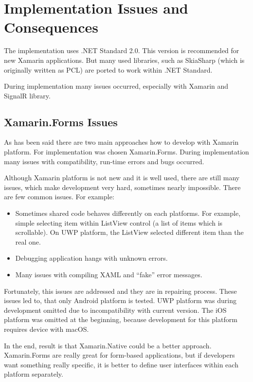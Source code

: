 \section{Implementation Issues and Consequences}
The implementation uses .NET Standard 2.0. This version is recommended for new Xamarin applications. But many used libraries, such as SkiaSharp (which is originally written as PCL) are ported to work within .NET Standard.

During implementation many issues occurred, especially with Xamarin and SignalR library.
\subsection{Xamarin.Forms Issues}
As has been said there are two main approaches how to develop with Xamarin platform. For implementation was chosen Xamarin.Forms. During implementation many issues with compatibility, run-time errors and bugs occurred. 

Although Xamarin platform is not new and it is well used, there are still many issues, which make development very hard, sometimes nearly impossible. There are few common issues. For example:
\begin{itemize}
\item Sometimes shared code behaves differently on each platforms. For example, simple selecting item within ListView control (a list of items which is scrollable). On UWP platform, the ListView selected different item than the real one. 
\item Debugging application hangs with unknown errors.
\item Many issues with compiling XAML and ``fake'' error messages. 
\end{itemize}

Fortunately, this issues are addressed and they are in repairing process. These issues led to, that only Android platform is tested. UWP platform was during development omitted due to incompatibility with current version. The iOS platform was omitted at the beginning, because development for this platform requires device with macOS. 

In the end, result is that Xamarin.Native could be a better approach. Xamarin.Forms are really great for form-based applications, but if developers want something really specific, it is better to define user interfaces within each platform separately. 

